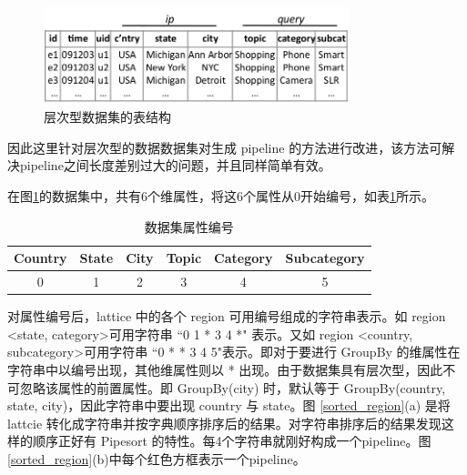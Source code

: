 \begin{figure}[!htb]
\centering\includegraphics[width=3.5in]{picture/ch_datacube_mr/dataset_table} 
\caption{层次型数据集的表结构}\label{dataset_table1} 
\end{figure} 

因此这里针对层次型的数据数据集对生成 pipeline 的方法进行改进，该方法可解决pipeline之间长度差别过大的问题，并且同样简单有效。



在图\ref{dataset_table1}的数据集中，共有6个维属性，将这6个属性从0开始编号，如表\ref{attribute_no}所示。

\begin{table}[!htb]
\begin{center}
\begin{tabular}{|c|c|c|c|c|c|}
\hline 
Country & State & City & Topic & Category & Subcategory \\ 
\hline 
0 & 1 & 2 & 3 & 4 & 5 \\ 
\hline 
\end{tabular} 
\end{center}
\caption{数据集属性编号}\label{attribute_no}
\end{table}

对属性编号后，lattice 中的各个 region 可用编号组成的字符串表示。如 region \textless state, category\textgreater 可用字符串 ``0 1 * 3 4 *" 表示。又如 region \textless country, subcategory\textgreater 可用字符串 ``0 * * 3 4 5"表示。即对于要进行 GroupBy 的维属性在字符串中以编号出现，其他维属性则以 * 出现。由于数据集具有层次型，因此不可忽略该属性的前置属性。即 GroupBy(city) 时，默认等于 GroupBy(country, state, city)，因此字符串中要出现 country 与 state。图 \ref{sorted_region}(a) 是将 lattcie 转化成字符串并按字典顺序排序后的结果。对字符串排序后的结果发现这样的顺序正好有 Pipesort 的特性。每4个字符串就刚好构成一个pipeline。图\ref{sorted_region}(b)中每个红色方框表示一个pipeline。

